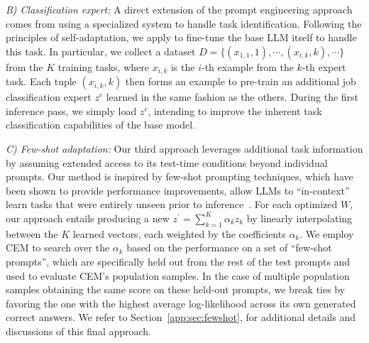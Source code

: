 \textit{B) Classification expert:} 
A direct extension of the prompt engineering approach comes from using a specialized system to handle task identification.
Following the principles of self-adaptation, we apply \svdacro to fine-tune the base LLM itself to handle this task.
In particular, we collect a dataset $D = \{(x_{1,1}, 1), \cdots, (x_{i,k}, k), \cdots \}$ from the $K$ \svdacro training tasks, where $x_{i,k}$ is the $i$-th example from the $k$-th expert task.
Each tuple $(x_{i,k}, k)$ then forms an example to pre-train an additional job classification expert $z^c$ learned in the same fashion as the others.
During the first inference pass, we simply load $z^c$, intending to improve the inherent task classification capabilities of the base model.

\textit{C) Few-shot adaptation:} Our third approach leverages additional task information by assuming extended access to its test-time conditions beyond individual prompts. 
Our method is inspired by few-shot prompting techniques, which have been shown to provide performance improvements, allow LLMs to ``in-context'' learn tasks that were entirely unseen prior to inference~\citep{brown2020language}.
For each optimized $W$, our approach entails producing a new $z^\prime=\sum^{K}_{k=1} \alpha_k z_k$ by linearly interpolating between the $K$ learned \svdacro vectors, each weighted by the coefficients $\alpha_k$.
We employ CEM to search over the $\alpha_k$ based on the performance on a set of ``few-shot prompts'', which are specifically held out from the rest of the test prompts and used to evaluate CEM's population samples. 
In the case of multiple population samples obtaining the same score on these held-out prompts, we break ties by favoring the one with the highest average log-likelihood across its own generated correct answers.
We refer to Section~\ref{app:sec:fewshot}, for additional details and discussions of this final approach. 

\vspace{-2mm}